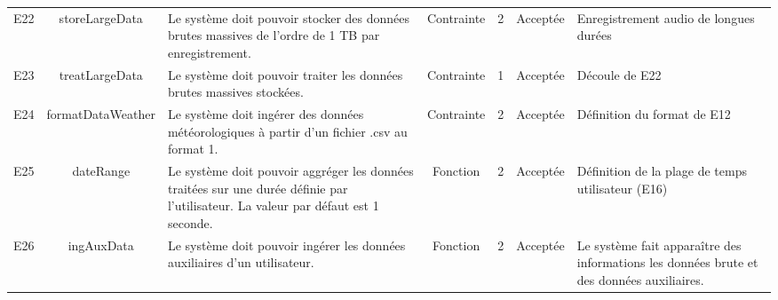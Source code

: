 \documentclass[a4paper]{article}
\begin{document}
\begin{longtable}{|c|c|p{4cm}|c|c|p{2cm}|p{4cm}|}
	E22 & storeLargeData & Le système doit pouvoir stocker des données brutes massives de l’ordre de 1 TB par enregistrement. & Contrainte & 2 & Acceptée & Enregistrement audio de longues durées \\
	E23 & treatLargeData & Le système doit pouvoir traiter les données brutes massives stockées. & Contrainte & 1 & Acceptée & Découle de E22 \\
	E24 & formatDataWeather & Le système doit ingérer des données météorologiques à partir d’un fichier .csv au format 1. & Contrainte & 2 & Acceptée & Définition du format de E12 \\
	E25 & dateRange & Le système doit pouvoir aggréger les données traitées sur une durée définie par l’utilisateur. La valeur par défaut est 1 seconde. & Fonction & 2 & Acceptée & Définition de la plage de temps utilisateur (E16) \\
	E26 & ingAuxData & Le système doit pouvoir ingérer les données auxiliaires d’un utilisateur. & Fonction & 2 & Acceptée & Le système fait apparaître des informations les données brute et des données auxiliaires. \\


\hline
\end{longtable}
\restoregeometry
\end{document}
